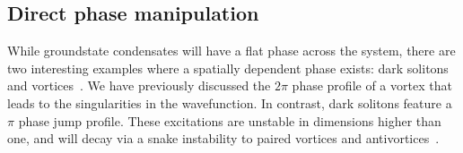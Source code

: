 \subsection{Direct phase manipulation}\label{sec:phase}

While groundstate condensates will have a flat phase across the system, there are two interesting examples where a spatially dependent phase exists: dark solitons~\cite{BEC:Denschlag_science_2000} and vortices~\cite{Vtx:Dobrek_pra_1999}. We have previously discussed the $2\pi$ phase profile of a vortex that leads to the singularities in the wavefunction. In contrast, dark solitons feature a $\pi$ phase jump profile. These excitations are unstable in dimensions higher than one, and will decay via a snake instability to paired vortices and antivortices~\cite{BEC:Brand_pra_2002}. %

